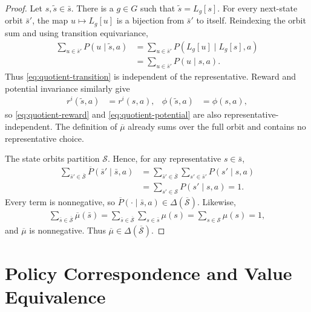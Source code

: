 \documentclass{article}
\theoremstyle{plain}
\theoremstyle{definition}
\theoremstyle{remark}
\newcommand{\St}{\mathcal{S}}
\newcommand{\quotient}[1]{\overline{#1}}
\begin{document}
\begin{proof}
Let $s,\widetilde s\in\bar s$. There is a $g\in G$ such that
$\widetilde s=L_g[s]$. For every next-state orbit $\bar s'$, the map
$u\mapsto L_g[u]$ is a bijection from $\bar s'$ to itself. Reindexing the orbit
sum and using transition equivariance,
\begin{align*}
  \sum_{u\in\bar s'}P(u\mid\widetilde s,a)
  &=
  \sum_{u\in\bar s'}P(L_g[u]\mid L_g[s],a)\\
  &=
  \sum_{u\in\bar s'}P(u\mid s,a).
\end{align*}
Thus \eqref{eq:quotient-transition} is independent of the representative.
Reward and potential invariance similarly give
\begin{align*}
  r^i(\widetilde s,a)
  &=
  r^i(s,a),&
  \phi(\widetilde s,a)
  &=
  \phi(s,a),
\end{align*}
so \eqref{eq:quotient-reward} and \eqref{eq:quotient-potential} are also
representative-independent. The definition of $\quotient\mu$ already sums over
the full orbit and contains no representative choice.

The state orbits partition $\St$. Hence, for any representative $s\in\bar s$,
\begin{align*}
  \sum_{\bar s'\in\quotient\St}
  \quotient P(\bar s'\mid\bar s,a)
  &=
  \sum_{\bar s'\in\quotient\St}
  \sum_{s'\in\bar s'}P(s'\mid s,a)\\
  &=
  \sum_{s'\in\St}P(s'\mid s,a)
  =
  1.
\end{align*}
Every term is nonnegative, so
$\quotient P(\cdot\mid\bar s,a)\in\Delta(\quotient\St)$. Likewise,
\begin{align*}
  \sum_{\bar s\in\quotient\St}\quotient\mu(\bar s)
  =
  \sum_{\bar s\in\quotient\St}\sum_{s\in\bar s}\mu(s)
  =
  \sum_{s\in\St}\mu(s)
  =
  1,
\end{align*}
and $\quotient\mu$ is nonnegative. Thus $\quotient\mu\in\Delta(\quotient\St)$.
\end{proof}

\section{Policy Correspondence and Value Equivalence}
\label{app:proof-policy-correspondence}
\end{document}
